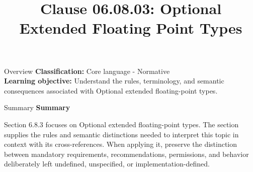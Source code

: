 \documentclass[10pt,letterpaper]{article}
\title{Clause 06.08.03: Optional Extended Floating Point Types}
\author{}
\date{}
\begin{document}
\maketitle
\begin{CornellOverviewBox}{Overview}
\textbf{Classification:} Core language - Normative\\[2pt]
\textbf{Learning objective:} Understand the rules, terminology, and semantic consequences associated with Optional extended floating-point types.
\end{CornellOverviewBox}\begin{CornellSummaryBox}{Summary}
{\sffamily\bfseries\color{Accent} Summary}\par\vspace{3pt}Section 6.8.3 focuses on Optional extended floating-point types. The section supplies the rules and semantic distinctions needed to interpret this topic in context with its cross-references. When applying it, preserve the distinction between mandatory requirements, recommendations, permissions, and behavior deliberately left undefined, unspecified, or implementation-defined.
\end{CornellSummaryBox}
\end{document}

